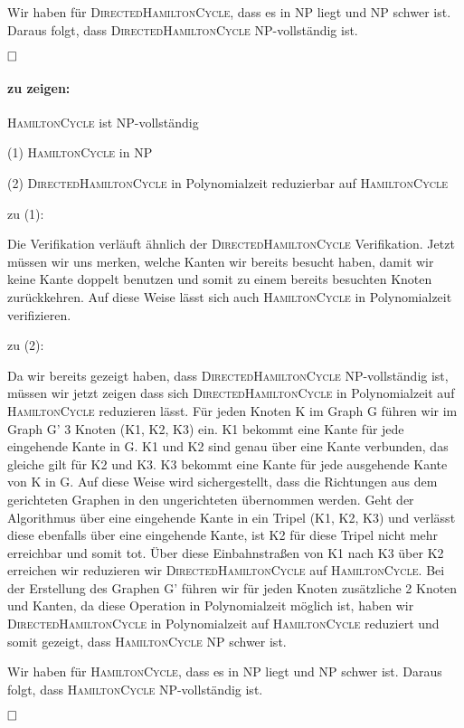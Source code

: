 \documentclass[12pt]{scrartcl}%
\theoremstyle{nonumberplain}
\begin{document}
\vspace{0.2cm}

Wir haben für {\scshape DirectedHamiltonCycle}, dass es in NP liegt und NP schwer ist. Daraus folgt, dass {\scshape DirectedHamiltonCycle} NP-vollständig ist.

$\hfill \square$ 

\paragraph{zu zeigen:} {\scshape HamiltonCycle} ist NP-vollständig

\vspace{0.2cm}
(1) {\scshape HamiltonCycle} in NP
\vspace{0.2cm}

(2) {\scshape DirectedHamiltonCycle} in Polynomialzeit reduzierbar auf {\scshape HamiltonCycle}
\vspace{0.4cm}

zu (1): 

Die Verifikation verläuft ähnlich der {\scshape DirectedHamiltonCycle} Verifikation. Jetzt müssen wir uns merken, welche Kanten wir bereits besucht haben, damit wir keine Kante doppelt benutzen und somit zu einem bereits besuchten Knoten zurückkehren. Auf diese Weise lässt sich auch {\scshape HamiltonCycle} in Polynomialzeit verifizieren.
\vspace{0.2cm}

zu (2): 

Da wir bereits gezeigt haben, dass {\scshape DirectedHamiltonCycle} NP-vollständig ist, müssen wir jetzt zeigen dass sich {\scshape DirectedHamiltonCycle} in Polynomialzeit auf {\scshape HamiltonCycle} reduzieren lässt. Für jeden Knoten K im Graph G führen wir im Graph G' 3 Knoten (K1, K2, K3) ein. K1 bekommt eine Kante für jede eingehende Kante in G. K1 und K2 sind genau über eine Kante verbunden, das gleiche gilt für K2 und K3. K3 bekommt eine Kante für jede ausgehende Kante von K in G. Auf diese Weise wird sichergestellt, dass die Richtungen aus dem gerichteten Graphen in den ungerichteten übernommen werden. Geht der Algorithmus über eine eingehende Kante in ein Tripel (K1, K2, K3) und verlässt diese ebenfalls über eine eingehende Kante, ist K2 für diese Tripel nicht mehr erreichbar und somit tot. Über diese Einbahnstraßen von K1 nach K3 über K2 erreichen wir reduzieren wir {\scshape DirectedHamiltonCycle} auf {\scshape HamiltonCycle}. Bei der Erstellung des Graphen G' führen wir für jeden Knoten zusätzliche 2 Knoten und Kanten, da diese Operation in Polynomialzeit möglich ist, haben wir {\scshape DirectedHamiltonCycle} in Polynomialzeit auf {\scshape HamiltonCycle} reduziert und somit gezeigt, dass {\scshape HamiltonCycle} NP schwer ist.

\vspace{0.2cm}

Wir haben für {\scshape HamiltonCycle}, dass es in NP liegt und NP schwer ist. Daraus folgt, dass {\scshape HamiltonCycle} NP-vollständig ist.

$\hfill \square$ 
\end{document}
